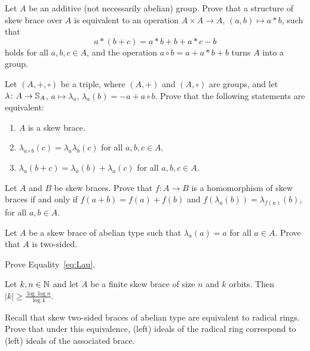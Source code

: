 \begin{prob}
\label{prob:star}
Let $A$ be an additive (not necessarily abelian) group.  
Prove that a structure of skew brace over $A$ is equivalent to an operation $A\times A\to
A$, $(a,b)\mapsto a*b$, such that 
\[
a*(b+c)=a*b+b+a*c-b
\]
holds for all $a,b,c\in A$, and the operation $a\circ b=a+a*b+b$ turns $A$
into a group. 
\end{prob}

\begin{prob}
\label{prob:equivalences}
	Let $(A,+,\circ)$ be a triple, where 
	$(A,+)$ and $(A,\circ)$ are
	groups, and let $\lambda\colon A\to\mathbb{S}_A$, $a\mapsto\lambda_a$, $\lambda_a(b)=-a+a\circ b$. 
	Prove that the following statements are equivalent:
	\begin{enumerate}
		\item $A$ is a skew brace.
		\item $\lambda_{a\circ b}(c)=\lambda_a\lambda_b(c)$ for all $a,b,c\in A$.
		\item $\lambda_a(b+c)=\lambda_a(b)+\lambda_a(c)$ for all $a,b,c\in A$.
	\end{enumerate}
\end{prob}

\begin{prob}
Let $A$ and $B$ be skew braces. Prove that $f\colon A\rightarrow B$ is a homomorphism of skew braces if and only if $f(a+b)=f(a)+f(b)$ and $f(\lambda_a(b))=\lambda_{f(a)}(b)$, for all $a,b\in A$.
\end{prob}


\begin{prob}
\label{prob:2sided}
	Let $A$ be a skew brace of abelian type such that $\lambda_a(a)=a$ for all $a\in A$.
	Prove that $A$ is two-sided.
\end{prob}

\begin{prob}
\label{prob:Lau}
    Prove Equality~\eqref{eq:Lau}.
\end{prob}

\begin{prob}
\label{prob:Landau}
Let $k,n\in\mathbb{N}$ and let $A$ be a finite skew brace of size $n$ and $k$ orbits. 
Then $|k|\geq\frac{\log\log n}{\log 4}$. 
\end{prob}


\begin{prob}
\label{prob:radical}
Recall that skew two-sided braces of abelian type are equivalent to radical rings. Prove that under this equivalence, 
(left) ideals of the radical ring correspond to (left) ideals of the associated brace. 
\end{prob}

